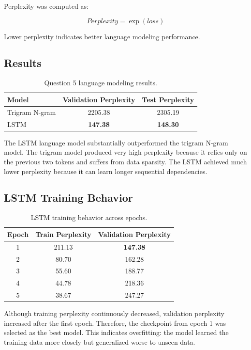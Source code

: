 \documentclass[11pt,a4paper]{article}
\begin{document}
Perplexity was computed as:

\begin{equation}
Perplexity = \exp(loss)
\end{equation}

Lower perplexity indicates better language modeling performance.

\subsection{Results}

\begin{table}[H]
\centering
\caption{Question 5 language modeling results.}
\begin{tabular}{lcc}
\toprule
Model & Validation Perplexity & Test Perplexity \\
\midrule
Trigram N-gram & 2205.38 & 2305.19 \\
LSTM & \textbf{147.38} & \textbf{148.30} \\
\bottomrule
\end{tabular}
\end{table}

The LSTM language model substantially outperformed the trigram N-gram model. The trigram model produced very high perplexity because it relies only on the previous two tokens and suffers from data sparsity. The LSTM achieved much lower perplexity because it can learn longer sequential dependencies.

\subsection{LSTM Training Behavior}

\begin{table}[H]
\centering
\caption{LSTM training behavior across epochs.}
\begin{tabular}{ccc}
\toprule
Epoch & Train Perplexity & Validation Perplexity \\
\midrule
1 & 211.13 & \textbf{147.38} \\
2 & 80.70 & 162.28 \\
3 & 55.60 & 188.77 \\
4 & 44.78 & 218.36 \\
5 & 38.67 & 247.27 \\
\bottomrule
\end{tabular}
\end{table}

Although training perplexity continuously decreased, validation perplexity increased after the first epoch. Therefore, the checkpoint from epoch 1 was selected as the best model. This indicates overfitting: the model learned the training data more closely but generalized worse to unseen data.
\end{document}

